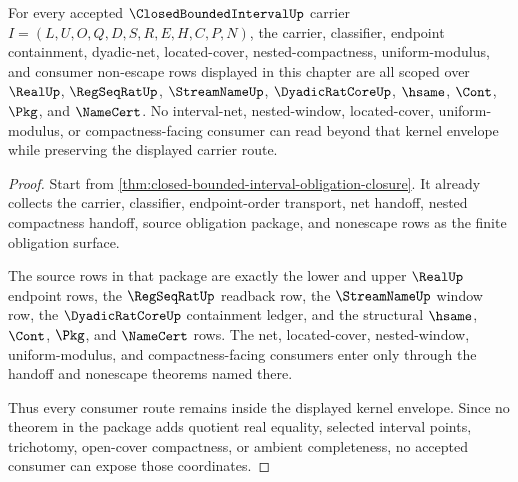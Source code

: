 \begin{theorem}
\label{thm:closed-bounded-interval-scoped-kernel-envelope}
For every accepted $\ClosedBoundedIntervalUp$ carrier $I=(L,U,O,Q,D,S,R,E,H,C,P,N)$, the carrier, classifier, endpoint containment, dyadic-net, located-cover, nested-compactness, uniform-modulus, and consumer non-escape rows displayed in this chapter are all scoped over $\RealUp$, $\RegSeqRatUp$, $\StreamNameUp$, $\DyadicRatCoreUp$, $\hsame$, $\Cont$, $\Pkg$, and $\NameCert$. No interval-net, nested-window, located-cover, uniform-modulus, or compactness-facing consumer can read beyond that kernel envelope while preserving the displayed carrier route.
\end{theorem}
\begin{proof}
Start from \autoref{thm:closed-bounded-interval-obligation-closure}. It already collects the carrier, classifier, endpoint-order transport, net handoff, nested compactness handoff, source obligation package, and nonescape rows as the finite obligation surface.

The source rows in that package are exactly the lower and upper $\RealUp$ endpoint rows, the $\RegSeqRatUp$ readback row, the $\StreamNameUp$ window row, the $\DyadicRatCoreUp$ containment ledger, and the structural $\hsame$, $\Cont$, $\Pkg$, and $\NameCert$ rows. The net, located-cover, nested-window, uniform-modulus, and compactness-facing consumers enter only through the handoff and nonescape theorems named there.

Thus every consumer route remains inside the displayed kernel envelope. Since no theorem in the package adds quotient real equality, selected interval points, trichotomy, open-cover compactness, or ambient completeness, no accepted consumer can expose those coordinates.
\end{proof}



